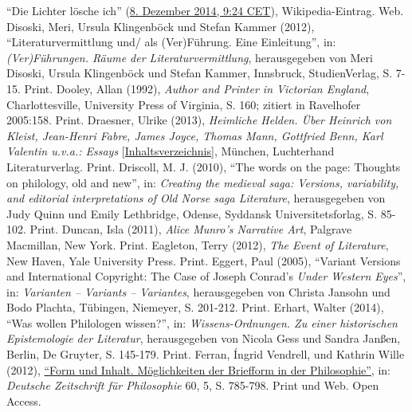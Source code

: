 \documentclass[fontsize=12pt]{scrartcl}
\begin{document}
{{{{\begin{thebibliography}
	"`Die Lichter l\"osche ich"' (\href{https://de.wikipedia.org/w/index.php?title=Die_Lichter_l\%C3\%B6sche_ich\&oldid=136571720}{8. Dezember 2014, 9:24 CET}), Wi\-ki\-pe\-dia-Ein\-trag. Web.
	Disoski, Meri, Ursula Klingenb\"ock und Stefan Kammer (2012), "`Li\-te\-ra\-tur\-ver\-mitt\-lung und/ als (Ver)F\"uh\-rung. Eine Einleitung"', in: \textit{(Ver)F\"uh\-rungen. R\"aume der Li\-te\-ra\-tur\-ver\-mitt\-lung}, he\-rausgegeben von Meri Disoski, Ursula Klingenb\"ock und Stefan Kammer, Innsbruck, StudienVerlag, S. 7-15. Print.
	Dooley, Allan (1992), \textit{Author and Printer in Victorian England}, Charlottesville, University Press of Virginia, S. 160; zitiert in Ravelhofer 2005:158. Print.
	Draesner, Ulrike (2013), \textit{Heimliche Helden. \"Uber Heinrich von Kleist, Jean-Henri Fabre, James Joyce, Thomas Mann, Gottfried Benn, Karl Valentin u.v.a.: Essays} [\href{http://d-nb.info/1028143508/04}{Inhaltsverzeichnis}], M\"unchen, Luchterhand Li\-te\-ra\-tur\-verlag. Print.
	Driscoll, M. J. (2010), "`The words on the page: Thoughts on philology, old and new"', in: \textit{Creating the medieval saga: Versions, variability, and editorial interpretations of Old Norse saga Li\-te\-ra\-ture}, he\-rausgegeben von Judy Quinn und Emily Lethbridge, Odense, Syddansk Universitetsforlag, S. 85-102. Print.
	Duncan, Isla (2011), \textit{Alice Munro's Narrative Art}, Palgrave Macmillan, New York. Print.
	Eagleton, Terry (2012), \textit{The Event of Li\-te\-ra\-ture}, New Haven, Yale University Press. Print.
	Eggert, Paul (2005), "`Variant Versions and International Copyright: The Case of Joseph Conrad's \textit{Under Western Eyes}"', in: \textit{Varianten -- Variants -- Variantes}, he\-rausgegeben von Christa Jansohn und Bodo Plachta, T\"ubingen, Niemeyer, S. 201-212. Print.
	Erhart, Walter (2014), "`Was wollen Philologen wissen?"', in: \textit{Wissens-Ordnungen. Zu ei\-ner historischen Epistemologie der Li\-te\-ra\-tur}, he\-rausgegeben von Nicola Gess und Sandra Jan{\ss}en, Berlin, De Gruyter, S. 145-179. Print.
	Ferran, \'{I}ngrid Vendrell, und Kathrin Wille (2012), \href{https://www.uni-marburg.de/fb03/philosophie/institut/mitarbeiter/vendrell/form-inhalt_vendrell-wille.pdf}{"`Form und Inhalt. M\"oglichkei\-ten der Briefform in der Philosophie"'}, in: \textit{Deutsche Zeitschrift f\"ur Philosophie} 60, 5, S. 785-798. Print und Web. Open Access.

\end{thebibliography}}}}}
\end{document}
